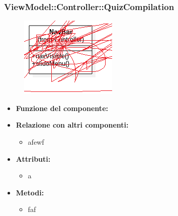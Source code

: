  \subsubsection{ViewModel::Controller::QuizCompilation}
 \begin{figure}[h!]
\begin{center}
	\includegraphics[scale=0.4]{../images/ViewModel/Controller/QuizCompilation.png}
\end{center}
\end{figure}
  \begin{itemize}
 \item\textbf{Funzione del componente:} 
 \item\textbf{Relazione con altri componenti:}
 \begin{itemize}
\item afewf
 \end{itemize}
 \item\textbf{Attributi:}
 \begin{itemize}
		\item a
 \end{itemize}
 \item\textbf{Metodi:}
 	\begin{itemize}
\item faf
 	\end{itemize}
 \end{itemize}
